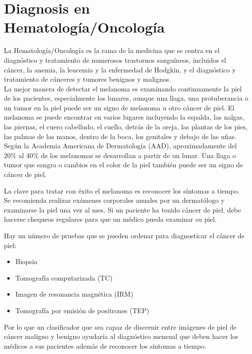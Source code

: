 
\section{Diagnosis en \\ Hematología/Oncología}
La Hematología/Oncología es la rama de la medicina que se centra en el diagnóstico y tratamiento de numerosos trastornos sanguíneos, incluidos el cáncer, la anemia, la leucemia y la enfermedad de Hodgkin, y el diagnóstico y tratamiento de cánceres y tumores benignos y malignos. \\
La mejor manera de detectar el melanoma es examinando continuamente la piel de los pacientes, especialmente los lunares, aunque una llaga, una protuberancia o un tumor en la piel puede ser un signo de melanoma u otro cáncer de piel. El melanoma se puede encontrar en varios lugares incluyendo la espalda, las nalgas, las piernas, el cuero cabelludo, el cuello, detrás de la oreja, las plantas de los pies, las palmas de las manos, dentro de la boca, los genitales y debajo de las uñas. \\
Según la Academia Americana de Dermatología (AAD), aproximadamente del 20\% al 40\% de los melanomas se desarrollan a partir de un lunar. Una llaga o tumor que sangra o cambios en el color de la piel también puede ser un signo de cáncer de piel. 

\pagestyle{fancy}
\fancyhf{}
\newpage
La clave para tratar con éxito el melanoma es reconocer los síntomas a tiempo. Se recomienda realizar exámenes corporales anuales por un dermatólogo y examinarse la piel una vez al mes. Si un paciente ha tenido cáncer de piel, debe hacerse chequeos regulares para que un médico pueda examinar su piel.

Hay un número de pruebas que se pueden ordenar para diagnosticar el cáncer de piel: 

\begin{itemize}
\item Biopsia
\item Tomografía computarizada (TC)
\item Imagen de resonancia magnética (IRM)
\item Tomografía por emisión de positrones (TEP)
\end{itemize}

Por lo que un clasificador que sea capaz de discernir entre imágenes de piel de cáncer maligno y benigno ayudaría al diagnóstico mensual que deben hacer los médicos a sus pacientes además de reconocer los síntomas a tiempo.
\newpage

